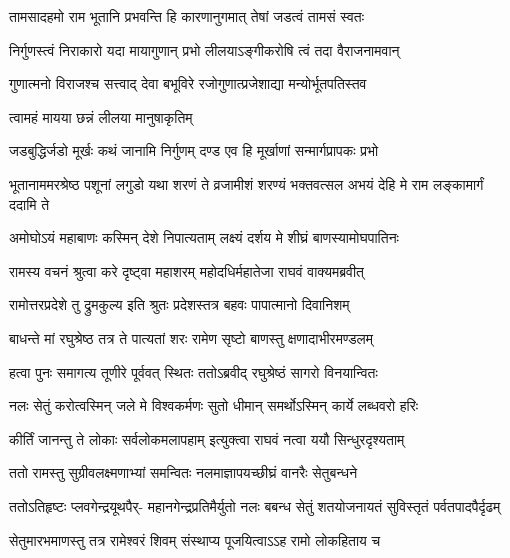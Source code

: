 \twolineshloka
{तामसादहमो राम भूतानि प्रभवन्ति हि}
{कारणानुगमात् तेषां जडत्वं तामसं स्वतः} %

\twolineshloka
{निर्गुणस्त्वं निराकारो यदा मायागुणान् प्रभो}
{लीलयाऽङ्गीकरोषि त्वं तदा वैराजनामवान्} %

\twolineshloka
{गुणात्मनो विराजश्च सत्त्वाद् देवा बभूविरे}
{रजोगुणात्प्रजेशाद्या मन्योर्भूतपतिस्तव} %

{त्वामहं मायया छन्नं लीलया मानुषाकृतिम्} %


\twolineshloka
{जडबुद्धिर्जडो मूर्खः कथं जानामि निर्गुणम्}
{दण्ड एव हि मूर्खाणां सन्मार्गप्रापकः प्रभो} %

\threelineshloka
{भूतानाममरश्रेष्ठ पशूनां लगुडो यथा}
{शरणं ते व्रजामीशं शरण्यं भक्तवत्सल}
{अभयं देहि मे राम लङ्कामार्गं ददामि ते} %


\twolineshloka
{अमोघोऽयं महाबाणः कस्मिन् देशे निपात्यताम्}
{लक्ष्यं दर्शय मे शीघ्रं बाणस्यामोघपातिनः} %

\twolineshloka
{रामस्य वचनं श्रुत्वा करे दृष्ट्वा महाशरम्}
{महोदधिर्महातेजा राघवं वाक्यमब्रवीत्} %

\twolineshloka
{रामोत्तरप्रदेशे तु द्रुमकुल्य इति श्रुतः}
{प्रदेशस्तत्र बहवः पापात्मानो दिवानिशम्} %

\twolineshloka
{बाधन्ते मां रघुश्रेष्ठ तत्र ते पात्यतां शरः}
{रामेण सृष्टो बाणस्तु क्षणादाभीरमण्डलम्} %

\twolineshloka
{हत्वा पुनः समागत्य तूणीरे पूर्ववत् स्थितः}
{ततोऽब्रवीद् रघुश्रेष्ठं सागरो विनयान्वितः} %

\twolineshloka
{नलः सेतुं करोत्वस्मिन् जले मे विश्वकर्मणः}
{सुतो धीमान् समर्थोऽस्मिन् कार्ये लब्धवरो हरिः} %

\twolineshloka
{कीर्तिं जानन्तु ते लोकाः सर्वलोकमलापहाम्}
{इत्युक्त्वा राघवं नत्वा ययौ सिन्धुरदृश्यताम्} %

\twolineshloka
{ततो रामस्तु सुग्रीवलक्ष्मणाभ्यां समन्वितः}
{नलमाज्ञापयच्छीघ्रं वानरैः सेतुबन्धने} %

\fourlineindentedshloka
{ततोऽतिहृष्टः प्लवगेन्द्रयूथपैर्-}
{महानगेन्द्रप्रतिमैर्युतो नलः}
{बबन्ध सेतुं शतयोजनायतं}
{सुविस्तृतं पर्वतपादपैर्दृढम्} %






\twolineshloka
{सेतुमारभमाणस्तु तत्र रामेश्वरं शिवम्}
{संस्थाप्य पूजयित्वाऽऽह रामो लोकहिताय च} %


